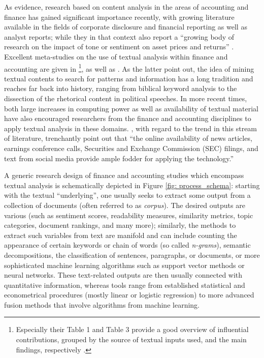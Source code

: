 As \textcite{YukselturkTucker2015} evidence, research based on content analysis in the areas of accounting and finance has gained significant importance recently, with growing literature available in the fields of corporate disclosure and financial reporting as well as analyst reports; while they in that context also report a \enquote{growing body of research on the impact of tone or sentiment on asset prices and returns} \parencite[871]{YukselturkTucker2015}. 
Excellent meta-studies on the use of textual analysis within finance and accounting are given in \textcite{KearneyLiu2014}\footnote{Especially their Table 1 and Table 3 provide a good overview of influential contributions, grouped by the source of textual inputs used, and the main findings, respectively \parencite[3, 12]{KearneyLiu2014}.}, \textcite{GuoShiTu2017} as well as \textcite{LM-meta-2016}. As the latter point out, the idea of mining textual contents to search for patterns and information has a long tradition and reaches far back into history, ranging from biblical keyword analysis to the dissection of the rhetorical content in political speeches. In more recent times, both large increases in computing power as well as availability of textual material have also encouraged researchers from the finance and accounting disciplines to apply textual analysis in these domains. \textcite[1188]{LM-meta-2016}, with regard to the trend in this stream of literature,  trenchantly point out that \enquote{the online availability of news articles, earnings conference calls, Securities and Exchange Commission (SEC) filings, and text from social media provide ample fodder for applying the technology.}  

A generic research design of finance and accounting studies which encompass textual analysis is schematically depicted in Figure \ref{fig: process_schema}: starting with the textual \enquote{underlying}, one usually seeks to extract some output from a collection of documents (often referred to as \textit{corpus}). The desired outputs are various (such as sentiment scores, readability measures, similarity metrics, topic categories, document rankings, and many more); similarly, the methods to extract such variables from text are manifold and can include counting the appearance of certain keywords or chain of words (so called \textit{n-grams}), semantic decompositions, the classification of sentences, paragraphs, or documents, or more sophisticated machine learning algorithms such as support vector methods or neural networks. These text-related outputs are then usually connected with quantitative information, whereas tools range from established statistical and econometrical procedures (mostly linear or logistic regression) to more advanced fusion methods that involve algorithms from machine learning.

